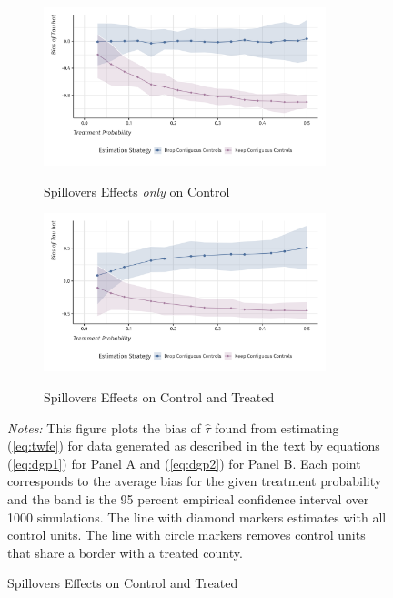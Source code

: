 \documentclass[11pt]{article}
\begin{document}
\begin{figure}[tb!]
    \caption{Effectiveness of Removing `Contaminated' Control Units}
    \label{fig:bias_drop_control}
    

    \begin{subfigure}[t]{\textwidth}
        \caption{Spillovers Effects \emph{only} on Control} \label{fig:bias_as_treat_prob}
        
        {\centering
            \includegraphics[width=0.9\textwidth]{../../figures/figure-bias_fix.png}
        }
    \end{subfigure}

    \begin{subfigure}[t]{\textwidth}
        \caption{Spillovers Effects on Control and Treated} \label{fig:bias_as_treat_prob_w_treat}
        
        {\centering
            \includegraphics[width=0.9\textwidth]{../../figures/figure-bias_fix_treat.png}
        }
    \end{subfigure}

    {\footnotesize
        \textit{Notes:} This figure plots the bias of $\hat{\tau}$ found from estimating (\ref{eq:twfe}) for data generated as described in the text by equations (\ref{eq:dgp1}) for Panel A and (\ref{eq:dgp2}) for Panel B. Each point corresponds to the average bias for the given treatment probability and the band is the 95 percent empirical confidence interval over 1000 simulations. The line with diamond markers estimates with all control units. The line with circle markers removes control units that share a border with a treated county. 
    }
\end{figure}
\end{document}
